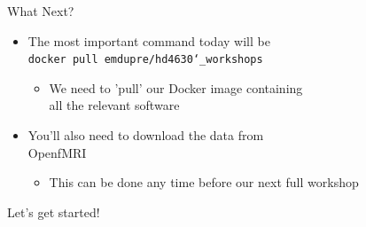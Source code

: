 \documentclass[t,12pt]{beamer}
\begin{document}
\begin{frame}{What Next?}
\vspace{10pt}
\begin{itemize}
\setlength\itemsep{1em}
  \item The most important command today will be \\
  \vspace{2pt}
  \texttt{docker pull emdupre/hd4630\char`_workshops}
  \vspace{4pt}
  \begin{itemize}
  \setlength\itemsep{0.5em}
    \item We need to 'pull' our Docker image containing \\
    all the relevant software
  \end{itemize}
  \item You'll also need to download the data from \\
  OpenfMRI
  \vspace{4pt}
  \begin{itemize}
  \setlength\itemsep{0.5em}
    \item This can be done any time before our next full workshop
  \end{itemize}
\end{itemize}
\end{frame}

\begin{frame}[plain,c]
\begin{center}
{\color{red} \LARGE Let's get started!}
\end{center}
\end{frame}
\end{document}
